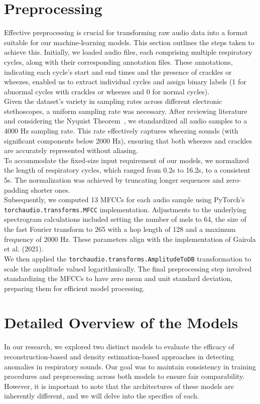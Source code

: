 \section{Preprocessing}
\label{method:preprocessing}
Effective preprocessing is crucial for transforming raw audio data into a format suitable for our machine-learning models. This section outlines the steps taken to achieve this.
Initially, we loaded audio files, each comprising multiple respiratory cycles, along with their corresponding annotation files. These annotations, indicating each cycle's start and end times and the presence of crackles or wheezes, enabled us to extract individual cycles and assign binary labels (1 for abnormal cycles with crackles or wheezes and 0 for normal cycles).\\
Given the dataset's variety in sampling rates across different electronic stethoscopes, a uniform sampling rate was necessary. After reviewing literature~\cite{cozzatti2022variational,serbes2018automated} and considering the Nyquist Theorem~\cite{por2019nyquist}, we standardized all audio samples to a 4000 Hz sampling rate. This rate effectively captures wheezing sounds (with significant components below 2000 Hz), ensuring that both wheezes and crackles are accurately represented without aliasing.\\
To accommodate the fixed-size input requirement of our models, we normalized the length of respiratory cycles, which ranged from 0.2s to 16.2s, to a consistent 5s. The normalization was achieved by truncating longer sequences and zero-padding shorter ones.\\
Subsequently, we computed 13 MFCCs for each audio sample using PyTorch's~\cite{paszke2019pytorch} \lstinline{torchaudio.transforms.MFCC} implementation. Adjustments to the underlying spectrogram calculations included setting the number of mels to 64, the size of the fast Fourier transform to 265 with a hop length of 128 and a maximum frequency of 2000 Hz. These parameters align with the implementation of Gairola et al. (2021).\\
We then applied the \lstinline{torchaudio.transforms.AmplitudeToDB} transformation to scale the amplitude valued logarithmically. The final preprocessing step involved standardizing the MFCCs to have zero mean and unit standard deviation, preparing them for efficient model processing.


\section{Detailed Overview of the Models}
In our research, we explored two distinct models to evaluate the efficacy of reconstruction-based and density estimation-based approaches in detecting anomalies in respiratory sounds. Our goal was to maintain consistency in training procedures and preprocessing across both models to ensure fair comparability. However, it is important to note that the architectures of these models are inherently different, and we will delve into the specifics of each.

